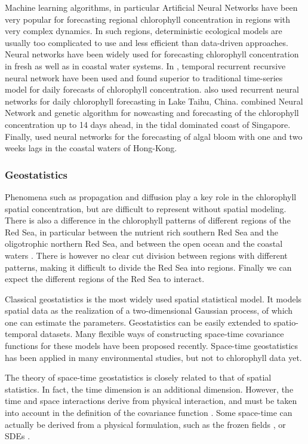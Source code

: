 Machine learning algorithms, in particular Artificial Neural Networks have been very popular for forecasting regional chlorophyll concentration in regions with very complex dynamics. In such regions, deterministic ecological models are usually too complicated to use and less efficient than data-driven approaches. Neural networks have been widely used for forecasting chlorophyll concentration in fresh as well as in coastal water systems. In \cite{Jeong2006}, temporal recurrent recursive neural network have been used and found superior to traditional time-series model for daily forecasts of chlorophyll concentration. \cite{Wang2013} also used recurrent neural networks for daily chlorophyll forecasting in Lake Taihu, China. \cite{Mulia2013} combined Neural Network and genetic algorithm for nowcasting and forecasting of the chlorophyll concentration up to 14 days ahead, in the tidal dominated coast of Singapore. Finally, \cite{Lee2013} used neural networks for the forecasting of algal bloom with one and two weeks lags in the coastal waters of Hong-Kong.
\subsubsection{Geostatistics}

Phenomena such as propagation and diffusion play a key role in the chlorophyll spatial concentration, but are difficult to represent without spatial modeling. There is also a difference in the chlorophyll patterns of different regions of the Red Sea, in particular between the nutrient rich southern Red Sea and the oligotrophic northern Red Sea, and between the open ocean and the coastal waters \cite{Raitsos2013}. There is however no clear cut division between regions with different patterns, making it difficult to divide the Red Sea into regions. Finally we can expect the different regions of the Red Sea to interact.

Classical geostatistics is the most widely used spatial statistical model. It models spatial data as the realization of a two-dimensional Gaussian process, of which one can estimate the parameters. Geostatistics can be easily extended to spatio-temporal datasets. Many flexible ways of constructing space-time covariance functions for these models have been proposed recently. Space-time geostatistics has been applied in many environmental studies, but not to chlorophyll data yet.

The theory of space-time geostatistics is closely related to that of spatial statistics. In fact, the time dimension is an additional dimension. However, the time and space interactions derive from physical interaction, and must be taken into account in the definition of the covariance function \cite{Gneiting2010}. Some space-time can actually be derived from a physical formulation, such as the frozen fields \cite{Gneiting2010}, or SDEs \cite{Brown2000, North2011}.


